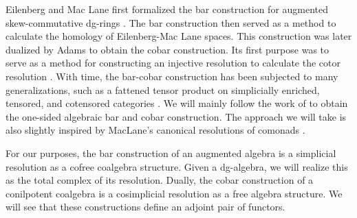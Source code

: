 \documentclass[../thesis.tex]{subfiles}
\begin{document}
            Eilenberg and Mac Lane first formalized the bar construction for augmented skew-commutative dg-rings \cite{Eilenberg53}. The bar construction then served as a method to calculate the homology of Eilenberg-Mac Lane spaces. This construction was later dualized by Adams \cite{Adams56} to obtain the cobar construction. Its first purpose was to serve as a method for constructing an injective resolution to calculate the cotor resolution \cite{Eilenberg65}. With time, the bar-cobar construction has been subjected to many generalizations, such as a fattened tensor product on simplicially enriched, tensored, and cotensored categories \cite{Riehl14}. We will mainly follow the work of \cite{Loday12} to obtain the one-sided algebraic bar and cobar construction. The approach we will take is also slightly inspired by MacLane's canonical resolutions of comonads \cite{MacLane71}.

            For our purposes, the bar construction of an augmented algebra is a simplicial resolution as a cofree coalgebra structure. Given a dg-algebra, we will realize this as the total complex of its resolution. Dually, the cobar construction of a conilpotent coalgebra is a cosimplicial resolution as a free algebra structure. We will see that these constructions define an adjoint pair of functors.



\end{document}
